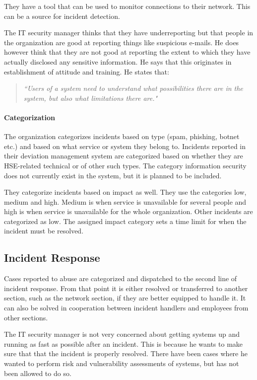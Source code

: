 They have a tool that can be used to monitor connections to their network. This can be a source for incident detection.

The IT security manager thinks that they have underreporting but that people in the organization are good at reporting things like suspicious e-mails. He does however think that they are not good at reporting the extent to which they have actually disclosed any sensitive information. He says that this originates in establishment of attitude and training. He states that:

\begin{quote}
\textit{``Users of a system need to understand what possibilities there are in the system, but also what limitations there are."} 
\end{quote}

\paragraph{Categorization}
The organization categorizes incidents based on type (spam, phishing, botnet etc.) and based on what service or system they belong to. Incidents reported in their deviation management system are categorized based on whether they are \ac{HSE}-related technical or of other such types. The category information security does not currently exist in the system, but it is planned to be included.

They categorize incidents based on impact as well. They use the categories low, medium and high. Medium is when service is unavailable for several people and high is when service is unavailable for the whole organization. Other incidents are categorized as low. The assigned impact category sets a time limit for when the incident must be resolved.

\subsection{Incident Response}
Cases reported to abuse are categorized and dispatched to the second line of incident response. %
From that point it is either resolved or transferred to another section, such as the network section, if they are better equipped to handle it. It can also be solved in cooperation between incident handlers and employees from other sections.

The IT security manager is not very concerned about getting systems up and running as fast as possible after an incident. This is because he wants to make sure that that the incident is properly resolved. There have been cases where he wanted to perform risk and vulnerability assessments of systems, but has not been allowed to do so.

